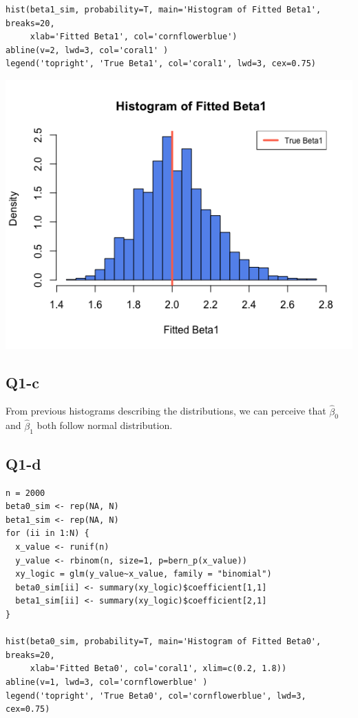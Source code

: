 \documentclass[12pt,letterpaper]{article}
\let\hat\widehat
\begin{document}
\begin{verbatim}
hist(beta1_sim, probability=T, main='Histogram of Fitted Beta1', breaks=20,
     xlab='Fitted Beta1', col='cornflowerblue')
abline(v=2, lwd=3, col='coral1' )
legend('topright', 'True Beta1', col='coral1', lwd=3, cex=0.75)
\end{verbatim}

\includegraphics[width=150mm]{hist_beta1.png}

\subsection*{Q1-c}
\noindent From previous histograms describing the distributions, we can perceive that $\hat{\beta}_0$ and $\hat{\beta}_1$ both follow normal distribution. 

\newpage
\subsection*{Q1-d}
\begin{verbatim}
n = 2000
beta0_sim <- rep(NA, N)
beta1_sim <- rep(NA, N)
for (ii in 1:N) {
  x_value <- runif(n)
  y_value <- rbinom(n, size=1, p=bern_p(x_value))
  xy_logic = glm(y_value~x_value, family = "binomial")
  beta0_sim[ii] <- summary(xy_logic)$coefficient[1,1]
  beta1_sim[ii] <- summary(xy_logic)$coefficient[2,1]
}

hist(beta0_sim, probability=T, main='Histogram of Fitted Beta0', breaks=20,
     xlab='Fitted Beta0', col='coral1', xlim=c(0.2, 1.8))
abline(v=1, lwd=3, col='cornflowerblue' )
legend('topright', 'True Beta0', col='cornflowerblue', lwd=3, cex=0.75)
\end{verbatim}
\end{document}
